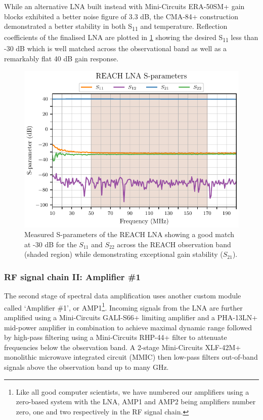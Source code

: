 While an alternative LNA built instead with Mini-Circuits ERA-50SM+ gain blocks exhibited a better noise figure of 3.3 dB, the CMA-84+ construction demonstrated a better stability in both S\textsubscript{11} and temperature. Reflection coefficients of the finalised LNA are plotted in \cref{fig:lna_sparams} showing the desired S\textsubscript{11} less than -30 dB which is well matched across the observational band as well as a remarkably flat 40 dB gain response.
\begin{figure}
    \includegraphics[width=\columnwidth]{lna_sparams}
    \caption{Measured S-parameters of the REACH LNA showing a good match at -30 dB for the $S_{11}$ and $S_{22}$ across the REACH observation band (shaded region) while demonstrating exceptional gain stability ($S_{21}$).}
    \label{fig:lna_sparams}
\end{figure}


\subsubsection{RF signal chain II: Amplifier \#1}
The second stage of spectral data amplification uses another custom module called ‘Amplifier \#1’, or AMP1\footnote{Like all good computer scientists, we have numbered our amplifiers using a zero-based system with the LNA, AMP1 and AMP2 being amplifiers number zero, one and two respectively in the RF signal chain.}. Incoming signals from the LNA are further amplified using a Mini-Circuits GALI-S66+ limiting amplifier and a PHA-13LN+ mid-power amplifier in combination to achieve maximal dynamic range followed by high-pass filtering using a Mini-Circuits RHP-44+ filter to attenuate frequencies below the observation band. A 2-stage Mini-Circuits XLF-42M+ monolithic microwave integrated circuit (MMIC) then low-pass filters out-of-band signals above the observation band up to many GHz.

